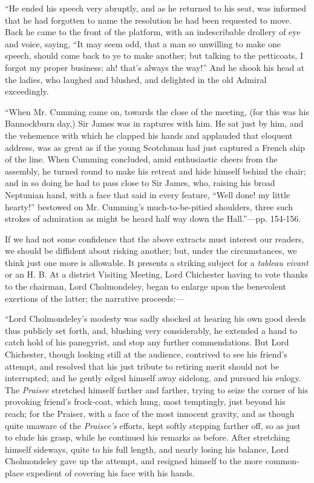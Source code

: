 ``He
ended his speech very abruptly, and as he returned to his seat, was
informed that he had forgotten to name the resolution he had been
requested to move. Back he came to the front of the platform, with an
indescribable drollery of eye and voice, saying, ``It may seem odd, that
a man so unwilling to make one speech, should come back to ye to
make
another; but talking to the petticoats, I forgot my proper business; ah!
that's always the way!'' And he shook his head at the ladies, who laughed
and blushed, and delighted in the old Admiral exceedingly.

``When
Mr. Cumming came on, towards the close of the meeting, (for this was his
Bannockburn day,) Sir James was in raptures with him. He sat just by
him, and the vehemence with which he clapped his hands and applauded
that eloquent address, was as great as if the young Scotchman had just
captured a French ship of the line. When Cumming concluded, amid
enthusiastic cheers from the assembly, he turned round to make his
retreat and hide himself behind the chair; and in so doing he had to
pass close to Sir James, who, raising his broad Neptunian hand, with a
face that said in every feature, ``Well done! my little hearty!'' bestowed
on Mr. Cumming's much-to-be-pitied shoulders, three such strokes of
admiration as might be heard half way down the Hall.''—pp. 154-156.

If we had
not some confidence that the above extracts must interest our readers,
we should be diffident about risking another; but, under the
circumstances, we think just one more is allowable. It presents a
striking subject for a \emph{tableau vivant} or an H. B. At a district
Visiting Meeting, Lord Chichester having to vote thanks to the chairman,
Lord Cholmondeley, began to enlarge upon the benevolent exertions of the
latter; the narrative proceeds:—

``Lord
Cholmondeley's modesty was sadly shocked at hearing his own good deeds
thus publicly set forth, and, blushing very considerably, he extended a
hand to catch hold of his panegyrist, and stop any further
commendations. But Lord Chichester, though looking still at the
audience, contrived to see his friend's attempt, and resolved that his
just tribute to retiring merit should not be interrupted; and he gently
edged himself away sidelong, and pursued his eulogy. The \emph{Praisee}
stretched himself farther and farther, trying to seize the corner of his
provoking friend's frock-coat, which hung, most temptingly, just beyond
his reach; for the Praiser, with a face of the most innocent gravity,
and as though quite unaware of the \emph{Praisee's} efforts, kept softly
stepping farther off, so as just to elude his grasp, while he continued
his remarks as before. After stretching himself sideways, quite to his
full length, and nearly losing his balance, Lord Cholmondeley gave up
the attempt, and resigned himself to the more common-place expedient of
covering his face with his hands.

